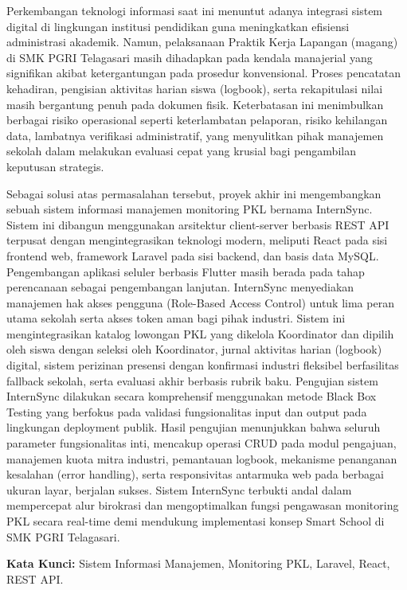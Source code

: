 
Perkembangan teknologi informasi saat ini menuntut adanya integrasi sistem digital di lingkungan institusi pendidikan guna meningkatkan efisiensi administrasi akademik. Namun, pelaksanaan Praktik Kerja Lapangan (magang) di SMK PGRI Telagasari masih dihadapkan pada kendala manajerial yang signifikan akibat ketergantungan pada prosedur konvensional. Proses pencatatan kehadiran, pengisian aktivitas harian siswa (logbook), serta rekapitulasi nilai masih bergantung penuh pada dokumen fisik. Keterbatasan ini menimbulkan berbagai risiko operasional seperti keterlambatan pelaporan, risiko kehilangan data, lambatnya verifikasi administratif, yang menyulitkan pihak manajemen sekolah dalam melakukan evaluasi cepat yang krusial bagi pengambilan keputusan strategis.

Sebagai solusi atas permasalahan tersebut, proyek akhir ini mengembangkan sebuah sistem informasi manajemen monitoring PKL bernama InternSync. Sistem ini dibangun menggunakan arsitektur client-server berbasis REST API terpusat dengan mengintegrasikan teknologi modern, meliputi React pada sisi frontend web, framework Laravel pada sisi backend, dan basis data MySQL. Pengembangan aplikasi seluler berbasis Flutter masih berada pada tahap perencanaan sebagai pengembangan lanjutan. InternSync menyediakan manajemen hak akses pengguna (Role-Based Access Control) untuk lima peran utama sekolah serta akses token aman bagi pihak industri. Sistem ini mengintegrasikan katalog lowongan PKL yang dikelola Koordinator dan dipilih oleh siswa dengan seleksi oleh Koordinator, jurnal aktivitas harian (logbook) digital, sistem perizinan presensi dengan konfirmasi industri fleksibel berfasilitas fallback sekolah, serta evaluasi akhir berbasis rubrik baku. Pengujian sistem InternSync dilakukan secara komprehensif menggunakan metode Black Box Testing yang berfokus pada validasi fungsionalitas input dan output pada lingkungan deployment publik. Hasil pengujian menunjukkan bahwa seluruh parameter fungsionalitas inti, mencakup operasi CRUD pada modul pengajuan, manajemen kuota mitra industri, pemantauan logbook, mekanisme penanganan kesalahan (error handling), serta responsivitas antarmuka web pada berbagai ukuran layar, berjalan sukses. Sistem InternSync terbukti andal dalam mempercepat alur birokrasi dan mengoptimalkan fungsi pengawasan monitoring PKL secara real-time demi mendukung implementasi konsep Smart School di SMK PGRI Telagasari.

\textbf{Kata Kunci:} Sistem Informasi Manajemen, Monitoring PKL, Laravel, React, REST API.
